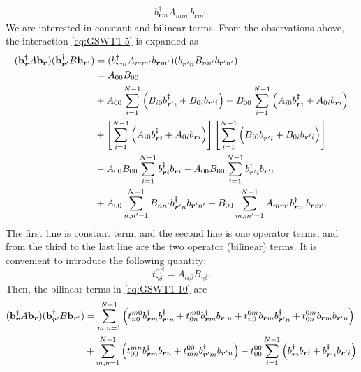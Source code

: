 \documentclass[11pt, aps, longbibliography]{article}
\begin{document}
\begin{align}\label{eq:GSWT1-9}
    b_{\bm{r}m}^\dagger A_{mm^\prime}b_{\bm{r}m^\prime}.
\end{align}
We are interested in constant and bilinear terms. From the observations above, the interaction \eqref{eq:GSWT1-5} is expanded as
\begin{align}\label{eq:GSWT1-10}
    (\mathbf{b}_{\bm{r}}^\dagger A\mathbf{b}_{\bm{r}})(\mathbf{b}_{\bm{r}^\prime}^\dagger B\mathbf{b}_{\bm{r}^\prime}) &= (b_{\bm{r}m}^\dagger A_{mm^\prime}b_{\bm{r}m^\prime})(b_{\bm{r}^\prime n}^\dagger B_{nn^\prime}b_{\bm{r}^\prime n^\prime}) \notag \\
    &= A_{00}B_{00} \notag \\
    &+ A_{00} \sum_{i=1}^{N-1}\left( B_{i0}b_{\bm{r}^\prime i}^\dagger +  B_{0i}b_{\bm{r}^\prime i}\right) + B_{00} \sum_{i=1}^{N-1}\left( A_{i0}b_{\bm{r} i}^\dagger +  A_{0i}b_{\bm{r} i}\right) \notag \\
    &+ \left[ \sum_{i=1}^{N-1}\left( A_{i0}b_{\bm{r} i}^\dagger +  A_{0i}b_{\bm{r} i}\right) \right] \left[ \sum_{i=1}^{N-1}\left( B_{i0}b_{\bm{r}^\prime i}^\dagger +  B_{0i}b_{\bm{r}^\prime i}\right) \right] \notag \\
    &- A_{00}B_{00}\sum_{i=1}^{N-1} b_{\bm{r}i}^\dagger b_{\bm{r}i} - A_{00}B_{00}\sum_{i=1}^{N-1} b_{\bm{r}^\prime i}^\dagger b_{\bm{r}^\prime i} \notag \\
    &+ A_{00}\sum_{n,n^\prime=1}^{N-1}B_{nn^\prime} b_{\bm{r}^\prime n}^\dagger b_{\bm{r}^\prime n^\prime} + B_{00}\sum_{m,m^\prime=1}^{N-1}A_{mm^\prime}b_{\bm{r}m}^\dagger b_{\bm{r}m^\prime}.
\end{align}
The first line is constant term, and the second line is one operator terms, and from the third to the last line are the two operator (bilinear) terms.
It is convenient to introduce the following quantity:
\begin{equation}\label{eq:GSWT1-11}
    t^{\alpha\beta}_{\gamma\delta} = A_{\alpha\beta}B_{\gamma\delta}.
\end{equation}
Then, the bilinear terms in \eqref{eq:GSWT1-10} are
\begin{align}\label{eq:GSWT1-12}
    (\mathbf{b}_{\bm{r}}^\dagger A\mathbf{b}_{\bm{r}})(\mathbf{b}_{\bm{r}^\prime}^\dagger B\mathbf{b}_{\bm{r}^\prime}) &= \sum_{m,n=1}^{N-1} \left( t^{m0}_{n0}b_{\bm{r}m}^\dagger b_{\bm{r}^\prime n}^\dagger +  t^{m0}_{0n}b_{\bm{r}m}^\dagger b_{\bm{r}^\prime n} + t^{0m}_{n0}b_{\bm{r}m} b_{\bm{r}^\prime n}^\dagger + t^{0m}_{0n}b_{\bm{r}m} b_{\bm{r}^\prime n} \right) \notag \\
    &+ \sum_{m,n=1}^{N-1} \left( t^{mn}_{00}b_{\bm{r}m}^\dagger b_{\bm{r}n} + t^{00}_{mn}b_{\bm{r}^\prime m}^\dagger b_{\bm{r}^\prime n} \right) - t^{00}_{00} \sum_{i=1}^{N-1} \left( b_{\bm{r}i}^\dagger b_{\bm{r}i} + b_{\bm{r}^\prime i}^\dagger b_{\bm{r}^\prime i}\right)
\end{align}
\end{document}
